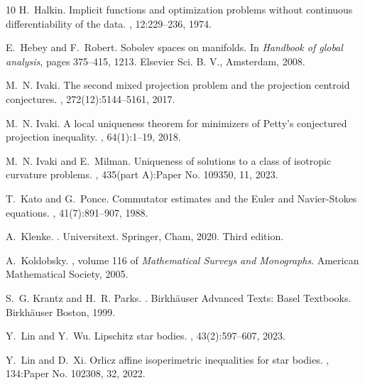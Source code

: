 \documentclass[11pt]{article}
\theoremstyle{definition}
\theoremstyle{proof}
\DeclareMathOperator{\+}{\mathop{\tilde{+}}}
\numberwithin{equation}{section}
\numberwithin{equation}{section}
\begin{document}
\begin{thebibliography}{10}
H.~Halkin.
\newblock Implicit functions and optimization problems without continuous
  differentiability of the data.
, 12:229--236, 1974.

E.~Hebey and F.~Robert.
\newblock Sobolev spaces on manifolds.
\newblock In {\em Handbook of global analysis}, pages 375--415, 1213. Elsevier
  Sci. B. V., Amsterdam, 2008.

M.~N. Ivaki.
\newblock The second mixed projection problem and the projection centroid
  conjectures.
, 272(12):5144--5161, 2017.

M.~N. Ivaki.
\newblock A local uniqueness theorem for minimizers of {P}etty's conjectured
  projection inequality.
, 64(1):1--19, 2018.

M.~N. Ivaki and E.~Milman.
\newblock Uniqueness of solutions to a class of isotropic curvature problems.
, 435(part A):Paper No. 109350, 11, 2023.

T.~Kato and G.~Ponce.
\newblock Commutator estimates and the {E}uler and {N}avier-{S}tokes equations.
, 41(7):891--907, 1988.

A.~Klenke.
.
\newblock Universitext. Springer, Cham, 2020.
\newblock Third edition.

A.~Koldobsky.
, volume 116 of {\em
  Mathematical Surveys and Monographs}.
\newblock American Mathematical Society, 2005.

S.~G. Krantz and H.~R. Parks.
.
\newblock Birkh\"{a}user Advanced Texts: Basel Textbooks. Birkh\"{a}user
  Boston, 1999.

Y.~Lin and Y.~Wu.
\newblock Lipschitz star bodies.
, 43(2):597--607, 2023.

Y.~Lin and D.~Xi.
\newblock Orlicz affine isoperimetric inequalities for star bodies.
, 134:Paper No. 102308, 32, 2022.


\end{thebibliography}
\end{document}
